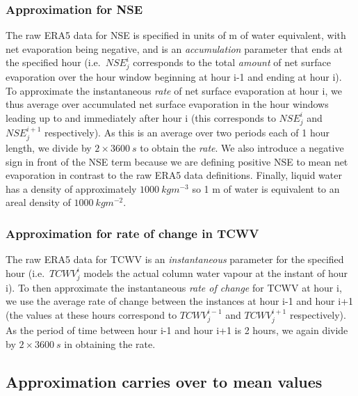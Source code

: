 \subsubsection{Approximation for NSE}

The raw \ac{ERA5} data for \ac{NSE} is specified in units of m of water equivalent, with net evaporation being negative, and is an \textit{accumulation} parameter that ends at the specified hour (i.e.\ $NSE^i_j$ corresponds to the total \textit{amount} of net surface evaporation over the hour window beginning at hour i-1 and ending at hour i). To approximate the instantaneous \textit{rate} of net surface evaporation at hour i, we thus average over accumulated net surface evaporation in the hour windows leading up to and immediately after hour i (this corresponds to $NSE^i_j$ and $NSE^{i+1}_j$ respectively). As this is an average over two periods each of 1 hour length, we divide by $2 \times 3600 \ s$ to obtain the \textit{rate}. We also introduce a negative sign in front of the \ac{NSE} term because we are defining positive \ac{NSE} to mean net evaporation in contrast to the raw \ac{ERA5} data definitions. Finally, liquid water has a density of approximately $1000 \ kg m^{-3}$ so 1 m of water is equivalent to an areal density of $1000 \ kg m^{-2}$.

\subsubsection{Approximation for rate of change in TCWV}

The raw \ac{ERA5} data for \ac{TCWV} is an \textit{instantaneous} parameter for the specified hour (i.e.\ $TCWV^i_j$ models the actual column water vapour at the instant of hour i). To then approximate the instantaneous \textit{rate of change} for \ac{TCWV} at hour i, we use the average rate of change between the instances at hour i-1 and hour i+1 (the values at these hours correspond to $TCWV^{i-1}_j$ and $TCWV^{i+1}_j$ respectively). As the period of time between hour i-1 and hour i+1 is 2 hours, we again divide by $2 \times 3600 \ s$ in obtaining the rate.

\subsection{Approximation carries over to mean values}

